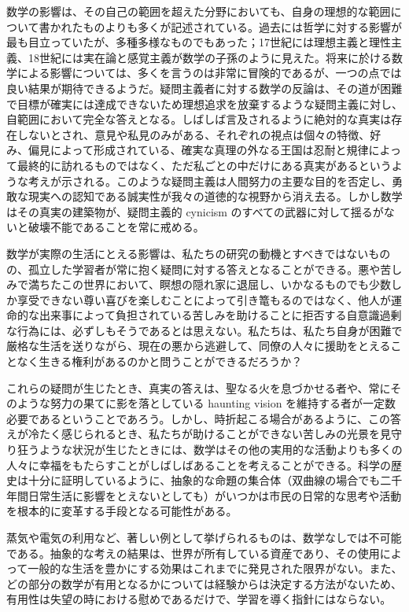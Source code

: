 \documentclass[a4paper,11pt,openany]{ltjsbook}
\begin{document}
数学の影響は、その自己の範囲を超えた分野においても、自身の理想的な範囲について書かれたものよりも多くが記述されている。過去には哲学に対する影響が最も目立っていたが、多種多様なものでもあった；17世紀には理想主義と理性主義、18世紀には実在論と感覚主義が数学の子孫のように見えた。将来に於ける数学による影響については、多くを言うのは非常に冒険的であるが、一つの点では良い結果が期待できるようだ。疑問主義者に対する数学の反論は、その道が困難で目標が確実には達成できないため理想追求を放棄するような疑問主義に対し、自範囲において完全な答えとなる。しばしば言及されるように絶対的な真実は存在しないとされ、意見や私見のみがある、それぞれの視点は個々の特徴、好み、偏見によって形成されている、確実な真理の外なる王国は忍耐と規律によって最終的に訪れるものではなく、ただ私ごとの中だけにある真実があるというような考えが示される。このような疑問主義は人間努力の主要な目的を否定し、勇敢な現実への認知である誠実性が我々の道徳的な視野から消え去る。しかし数学はその真実の建築物が、疑問主義的 cynicism のすべての武器に対して揺るがないと破壊不能であることを常に戒める。

数学が実際の生活にとえる影響は、私たちの研究の動機とすべきではないものの、孤立した学習者が常に抱く疑問に対する答えとなることができる。悪や苦しみで満ちたこの世界において、瞑想の隠れ家に退屈し、いかなるものでも少数しか享受できない尊い喜びを楽しむことによって引き篭もるのではなく、他人が運命的な出来事によって負担されている苦しみを助けることに拒否する自意識過剰な行為には、必ずしもそうであるとは思えない。私たちは、私たち自身が困難で厳格な生活を送りながら、現在の悪から逃避して、同僚の人々に援助をとえることなく生きる権利があるのかと問うことができるだろうか？

これらの疑問が生じたとき、真実の答えは、聖なる火を息づかせる者や、常にそのような努力の果てに影を落としている haunting vision を維持する者が一定数必要であるということであろう。しかし、時折起こる場合があるように、この答えが冷たく感じられるとき、私たちが助けることができない苦しみの光景を見守り狂うような状況が生じたときには、数学はその他の実用的な活動よりも多くの人々に幸福をもたらすことがしばしばあることを考えることができる。科学の歴史は十分に証明しているように、抽象的な命題の集合体（双曲線の場合でも二千年間日常生活に影響をとえないとしても）がいつかは市民の日常的な思考や活動を根本的に変革する手段となる可能性がある。

蒸気や電気の利用など、著しい例として挙げられるものは、数学なしでは不可能である。抽象的な考えの結果は、世界が所有している資産であり、その使用によって一般的な生活を豊かにする効果はこれまでに発見された限界がない。また、どの部分の数学が有用となるかについては経験からは決定する方法がないため、有用性は失望の時における慰めであるだけで、学習を導く指針にはならない。
\end{document}
